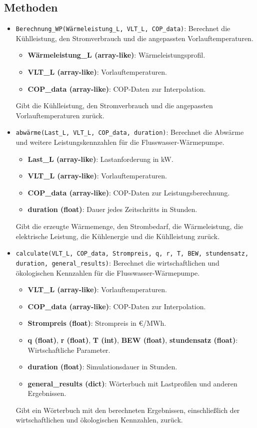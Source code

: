 \subsection{Methoden}
\begin{itemize}
    \item \texttt{Berechnung\_WP(Wärmeleistung\_L, VLT\_L, COP\_data)}: Berechnet die Kühlleistung, den Stromverbrauch und die angepassten Vorlauftemperaturen.
    \begin{itemize}
        \item \textbf{Wärmeleistung\_L (array-like)}: Wärmeleistungsprofil.
        \item \textbf{VLT\_L (array-like)}: Vorlauftemperaturen.
        \item \textbf{COP\_data (array-like)}: COP-Daten zur Interpolation.
    \end{itemize}
    Gibt die Kühlleistung, den Stromverbrauch und die angepassten Vorlauftemperaturen zurück.

    \item \texttt{abwärme(Last\_L, VLT\_L, COP\_data, duration)}: Berechnet die Abwärme und weitere Leistungskennzahlen für die Flusswasser-Wärmepumpe.
    \begin{itemize}
        \item \textbf{Last\_L (array-like)}: Lastanforderung in kW.
        \item \textbf{VLT\_L (array-like)}: Vorlauftemperaturen.
        \item \textbf{COP\_data (array-like)}: COP-Daten zur Leistungsberechnung.
        \item \textbf{duration (float)}: Dauer jedes Zeitschritts in Stunden.
    \end{itemize}
    Gibt die erzeugte Wärmemenge, den Strombedarf, die Wärmeleistung, die elektrische Leistung, die Kühlenergie und die Kühlleistung zurück.

    \item \texttt{calculate(VLT\_L, COP\_data, Strompreis, q, r, T, BEW, stundensatz, duration, general\_results)}: Berechnet die wirtschaftlichen und ökologischen Kennzahlen für die Flusswasser-Wärmepumpe.
    \begin{itemize}
        \item \textbf{VLT\_L (array-like)}: Vorlauftemperaturen.
        \item \textbf{COP\_data (array-like)}: COP-Daten zur Interpolation.
        \item \textbf{Strompreis (float)}: Strompreis in €/MWh.
        \item \textbf{q (float)}, \textbf{r (float)}, \textbf{T (int)}, \textbf{BEW (float)}, \textbf{stundensatz (float)}: Wirtschaftliche Parameter.
        \item \textbf{duration (float)}: Simulationsdauer in Stunden.
        \item \textbf{general\_results (dict)}: Wörterbuch mit Lastprofilen und anderen Ergebnissen.
    \end{itemize}
    Gibt ein Wörterbuch mit den berechneten Ergebnissen, einschließlich der wirtschaftlichen und ökologischen Kennzahlen, zurück.


\end{itemize}
